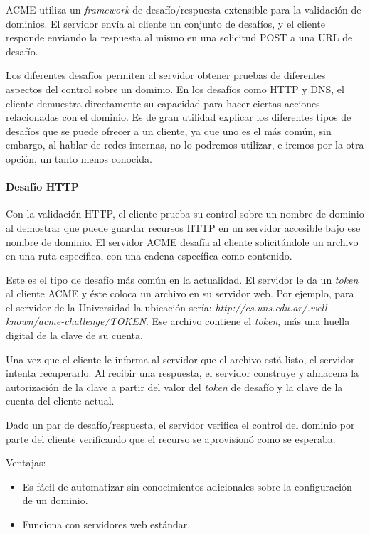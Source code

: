 ACME utiliza un \emph{framework} de desafío/respuesta extensible para la validación 
de dominios. El servidor envía al cliente un conjunto de desafíos, y el cliente 
responde enviando la respuesta al mismo en una solicitud POST a una URL de desafío.

Los diferentes desafíos permiten al servidor obtener pruebas de diferentes 
aspectos del control sobre un dominio. En los desafíos como HTTP y 
DNS, el cliente demuestra directamente su capacidad para hacer ciertas 
acciones relacionadas con el dominio. Es de gran utilidad explicar los 
diferentes tipos de desafíos que se puede ofrecer a un cliente, ya que uno 
es el más común, sin embargo, al hablar de redes internas, no lo podremos 
utilizar, e iremos por la otra opción, un tanto menos conocida.


\paragraph*{Desafío HTTP}

Con la validación HTTP, el cliente prueba su control sobre un nombre de dominio al 
demostrar que puede guardar recursos HTTP en un servidor accesible bajo ese nombre 
de dominio. El servidor ACME desafía al cliente solicitándole un archivo en una ruta 
específica, con una cadena específica como contenido.

Este es el tipo de desafío más común en la actualidad. El servidor le da un \emph{token} 
al cliente ACME y éste coloca un archivo en su servidor web. Por 
ejemplo, para el servidor de la Universidad la ubicación sería:
\textit{http://cs.uns.edu.ar/.well-known/acme-challenge/\emph{TOKEN}}. Ese archivo contiene 
el \emph{token}, más una huella digital de la clave de su cuenta.

Una vez que el cliente le informa al servidor que el archivo está listo, el servidor 
intenta recuperarlo. Al recibir una respuesta, el servidor construye y almacena la 
autorización de la clave a partir del valor del \emph{token} de desafío y la clave de 
la cuenta del cliente actual.

Dado un par de desafío/respuesta, el servidor verifica el control del dominio por 
parte del cliente verificando que el recurso se aprovisionó como se esperaba.

Ventajas:
\begin{itemize}
   \setlength\itemsep{-0.6em}
   \item Es fácil de automatizar sin conocimientos adicionales sobre la configuración de un dominio.
   \item Funciona con servidores web estándar.
\end{itemize}

